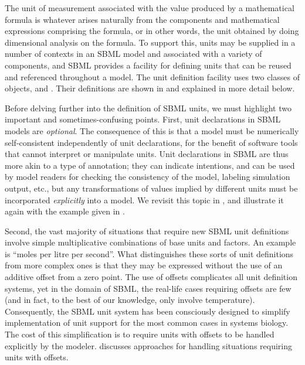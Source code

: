 The unit of measurement associated with the value produced by a
mathematical formula is whatever arises naturally from the
components and mathematical expressions comprising the formula, or
in other words, the unit obtained by doing dimensional analysis on
the formula.  To support this, units may be supplied in a number
of contexts in an SBML model and associated with a variety of
components, and SBML provides a facility for defining units that
can be reused and referenced throughout a model.  The unit
definition facility uses two classes of objects, \UnitDefinition
and \Unit.  Their definitions are shown in
 and explained in more detail
below.

Before delving further into the definition of SBML units, we must
highlight two important and sometimes-confusing points.  First,
unit declarations in SBML models are \emph{optional}.  The
consequence of this is that a model must be numerically
self-consistent independently of unit declarations, for the
benefit of software tools that cannot interpret or manipulate
units.  Unit declarations in SBML are thus more akin to a type of
annotation; they can indicate intentions, and can be used by model
readers for checking the consistency of the model, labeling
simulation output, etc., but any transformations of values implied
by different units must be incorporated \emph{explicitly} into a
model.  We revisit this topic in ,
and illustrate it again with the example given in
.

Second, the vast majority of situations that require new SBML unit
definitions involve simple multiplicative combinations of base
units and factors.  An example is ``moles per litre per second''.
What distinguishes these sorts of unit definitions from more
complex ones is that they may be expressed without the use of an
additive offset from a zero point.  The use of offsets complicates
all unit definition systems, yet in the domain of SBML, the
real-life cases requiring offsets are few (and in fact, to the
best of our knowledge, only involve temperature).  Consequently,
the SBML unit system has been consciously designed to simplify
implementation of unit support for the most common cases in
systems biology.  The cost of this simplification is to require
units with offsets to be handled explicitly by the modeler.
 discusses approaches
for handling situations requiring units with offsets.


\subsubsection{}
\label{sec:unitdefinition-structure}


